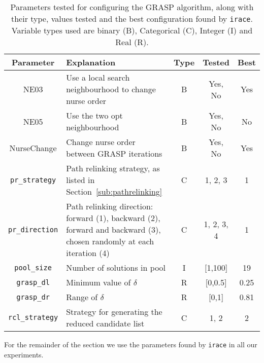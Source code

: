 \documentclass[a4paper,11pt,authoryear]{elsarticle}
\begin{document}
\begin{table}[h]
    \centering
    \caption{Parameters tested for configuring the GRASP algorithm, along with their type, values tested and the best configuration found by \texttt{irace}. Variable types used are binary (B), Categorical (C), Integer (I) and Real (R).}
    \begin{tabular}{cp{5.5cm}ccc}
    \toprule
    \textbf{Parameter}& \textbf{Explanation}  & \textbf{Type} & \textbf{Tested} & \textbf{Best} \\
    \midrule
    NE03 & Use a local search neighbourhood to change nurse order & B & Yes, No & Yes \\ %
    NE05 & Use the two opt neighbourhood & B & Yes, No & No \\ %
    NurseChange & Change nurse order between GRASP iterations & B & Yes, No & Yes \\ %
    \texttt{pr\_strategy} & Path relinking strategy, as listed in Section~\ref{sub:pathrelinking} & C & 1, 2, 3 & 1 \\ %
    \texttt{pr\_direction} & Path relinking direction: forward (1), backward (2), forward and backward (3), chosen randomly at each iteration (4) & C & 1, 2, 3, 4 & 1 \\ %
    \texttt{pool\_size} & Number of solutions in pool & I & [1,100] & 19 \\ %
    \texttt{grasp\_dl} & Minimum value of $\delta$ & R & [0,0.5] & 0.25 \\ %
    \texttt{grasp\_dr} & Range of $\delta$ & R & [0,1] & 0.81 \\ %
    \texttt{rcl\_strategy} & Strategy for generating the reduced candidate list & C & 1, 2 & 2 \\ %
    \bottomrule
    \end{tabular}
    \label{table:parameters}
\end{table}

\noindent For the remainder of the section we use the parameters found by \texttt{irace} in all our experiments.

\end{document}
